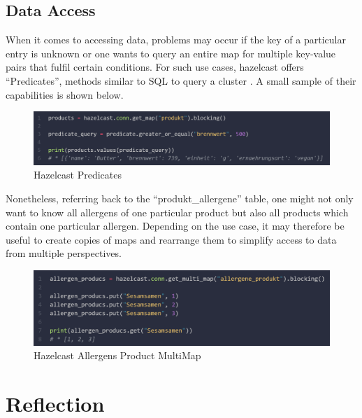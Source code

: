 \subsection{Data Access} \label{subsec:dataAccessHazelcast}

When it comes to accessing data, problems may occur if the key of a particular entry is unknown or one wants 
to query an entire map for multiple key-value pairs that fulfil certain conditions. For such use cases, 
hazelcast offers \enquote{Predicates}, methods similar to SQL to query a cluster \parencite{Hazelcast.Predicates}. 
A small sample of their capabilities is shown below. 

\begin{figure}[H]
    \includegraphics[width=1\textwidth]{images/hazelcast.predicates.png}
    \caption{Hazelcast Predicates} \label{fig:hazelcast.predicates}
\end{figure}

Nonetheless, referring back to the \enquote{produkt\_allergene} table, one might not only want to know all 
allergens of one particular product but also all products which contain one particular allergen. 
Depending on the use case, it may therefore be useful to create copies of maps and rearrange them 
to simplify access to data from multiple perspectives. 

\begin{figure}[H]
    \includegraphics[width=1\textwidth]{images/hazelcast.product_allergens.multimap.2.png}
    \caption{Hazelcast Allergens Product MultiMap} \label{fig:hazelcast.product_allergens.2.multimap}
\end{figure}


\section{Reflection} \label{sec:reflectionHazelcast}



